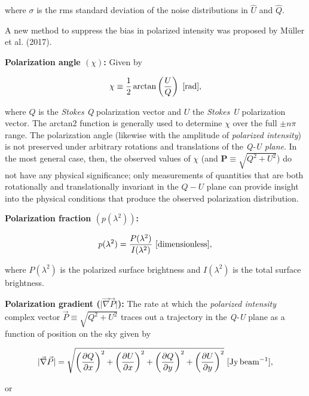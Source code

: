 \documentclass[a4paper,10pt]{article}
\begin{document}
{\noindent}where $\sigma$ is the rms standard deviation of the noise distributions in $\hat{U}$ and $\hat{Q}$.

{\noindent}A new method to suppress the bias in polarized intensity was proposed by M\"{u}ller et al. (2017).

{\noindent}\textbf{Polarization angle $(\chi)$:} Given by

\begin{align*}
    \chi\equiv\frac{1}{2}\arctan\left(\frac{U}{Q}\right) ~ [{\rm rad}],
\end{align*}

{\noindent}where $Q$ is the \textit{Stokes Q} polarization vector and $U$ the \textit{Stokes U} polarization vector. The arctan2 function is generally used to determine $\chi$ over the full $\pm n\pi$ range. The polarization angle (likewise with the amplitude of \textit{polarized intensity}) is not preserved under arbitrary rotations and translations of the \textit{Q-U plane}. In the most general case, then, the observed values of $\chi$ (and $\mathbf{P}\equiv\sqrt{Q^2+U^2}$) do not have any physical significance; only measurements of quantities that are both rotationally and translationally invariant in the $Q-U$ plane can provide insight into the physical conditions that produce the observed polarization distribution.

{\noindent}\textbf{Polarization fraction $(p(\lambda^2))$:}

\begin{align*}
    p(\lambda^2) = \frac{P(\lambda^2)}{I(\lambda^2)} ~ [{\rm dimensionless}],
\end{align*}

{\noindent}where $P(\lambda^2)$ is the polarized surface brightness and $I(\lambda^2)$ is the total surface brightness.

{\noindent}\textbf{Polarization gradient ($\lvert\vec{\nabla}\vec{P}\rvert$):} The rate at which the \textit{polarized intensity} complex vector $\vec{P}\equiv\sqrt{Q^2+U^2}$ traces out a trajectory in the \textit{Q-U} plane as a function of position on the sky given by

\begin{align*}
    \lvert\vec\nabla\vec{P}\rvert = \sqrt{\left(\frac{\partial Q}{\partial x}\right)^2 + \left(\frac{\partial U}{\partial x}\right)^2 + \left(\frac{\partial Q}{\partial y}\right)^2 + \left(\frac{\partial U}{\partial y}\right)^2} ~ [{\rm Jy\,beam^{-1}}],
\end{align*}

{\noindent}or
\end{document}

